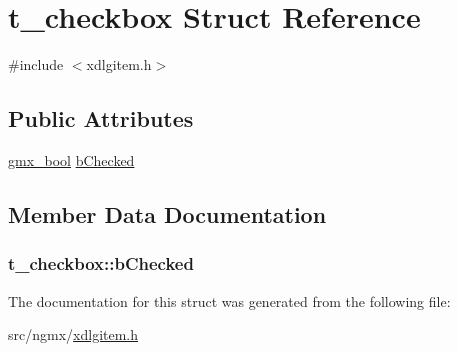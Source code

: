 \hypertarget{structt__checkbox}{\section{t\-\_\-checkbox \-Struct \-Reference}
\label{structt__checkbox}
}


{\ttfamily \#include $<$xdlgitem.\-h$>$}

\subsection*{\-Public \-Attributes}
\begin{DoxyCompactItemize}
\item 
\hyperlink{include_2types_2simple_8h_a8fddad319f226e856400d190198d5151}{gmx\-\_\-bool} \hyperlink{structt__checkbox_a24c30b40677f46ceec4aea07b5faf478}{b\-Checked}
\end{DoxyCompactItemize}


\subsection{\-Member \-Data \-Documentation}
\hypertarget{structt__checkbox_a24c30b40677f46ceec4aea07b5faf478}{
\subsubsection[{b\-Checked}]{ {\bf t\-\_\-checkbox\-::b\-Checked}}}\label{structt__checkbox_a24c30b40677f46ceec4aea07b5faf478}


\-The documentation for this struct was generated from the following file\-:\begin{DoxyCompactItemize}
\item 
src/ngmx/\hyperlink{xdlgitem_8h}{xdlgitem.\-h}\end{DoxyCompactItemize}
